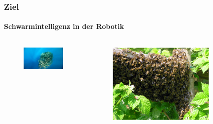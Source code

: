 \documentclass{beamer}
\begin{document}
\begin{frame} 
	\frametitle{Ziel}\framesubtitle{Schwarmintelligenz in der Robotik}
	
	\begin{columns}
		\begin{column}{0.30\textwidth}
			\begin{figure}
				\centering
				\includegraphics[width=\textwidth]{bilder/Schwarm_Fische2.jpg}
			\end{figure}
		\end{column}
		\begin{column}{0.224\textwidth}
			\begin{figure}
				\centering
				\includegraphics[width=\textwidth]{bilder/Schwarm_Bienen2.jpg}
			\end{figure}
		\end{column}
		\begin{column}{0.25\textwidth}
			\begin{figure}

\end{figure}
\end{column}
\end{columns}
\end{frame}
\end{document}
